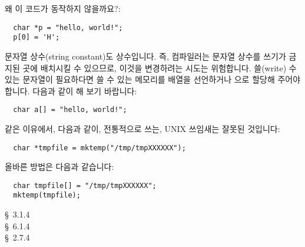 \begin{faq}
	왜 이 코드가 동작하지 않을까요?:
\begin{verbatim}
  char *p = "hello, world!";
  p[0] = 'H';
\end{verbatim}

\A
	문자열 상수(string constant)도 상수입니다. 즉, 컴파일러는 문자열 상수를
        쓰기가 금지된 곳에 배치시킬 수 있으므로, 이것을 변경하려는 시도는 위험합니다.
        쓸(write) 수 있는 문자열이 필요하다면 쓸 수 있는 메모리를 
        배열을 선언하거나 으로 할당해 주어야 합니다.
        다음과 같이 해 보기 바랍니다:
\begin{verbatim}
  char a[] = "hello, world!";
\end{verbatim}
	\noindent 같은 이유에서, 다음과 같이,
        전통적으로 쓰는, UNIX  쓰임새는 잘못된 것입니다:
\begin{verbatim}
  char *tmpfile = mktemp("/tmp/tmpXXXXXX");
\end{verbatim}
	\noindent 올바른 방법은 다음과 같습니다:
\begin{verbatim}
  char tmpfile[] = "/tmp/tmpXXXXXX";
  mktemp(tmpfile);
\end{verbatim}
	
\R
	\cite{ansi} \S\ 3.1.4 \\
	\cite{c89} \S\ 6.1.4 \\
	\cite{hs} \S\ 2.7.4 
\end{faq}

